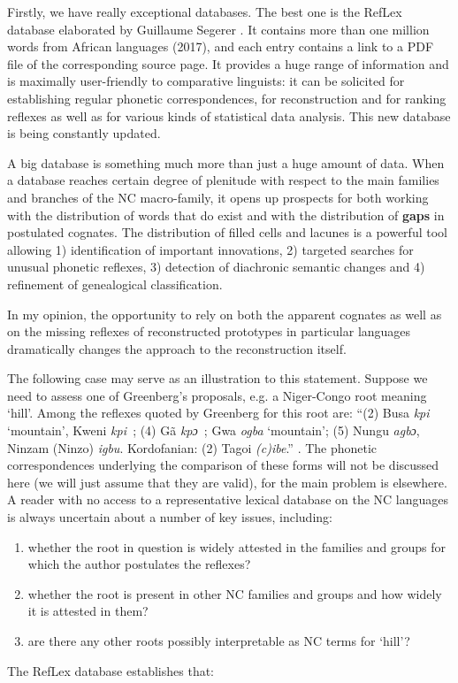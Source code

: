 Firstly, we have really exceptional databases. The best one is the RefLex database elaborated by Guillaume Segerer \citep{RefLex}. It contains more than one million words from African languages (2017), and each entry contains a link to a PDF file of the corresponding source page. It provides a huge range of information and is maximally user-friendly to comparative linguists: it can be solicited for establishing regular phonetic correspondences, for reconstruction and for ranking reflexes as well as for various kinds of statistical data analysis. This new database is being constantly updated. 

A big database is something much more than just a huge amount of data. When a database  reaches certain degree of plenitude with respect to the main families and branches of the NC macro-family, it opens up prospects for both working with the distribution of words that do exist and with the distribution of \textbf{gaps} in postulated cognates. The distribution of filled cells and lacunes is a powerful tool allowing 1) identification of important innovations, 2) targeted searches for unusual phonetic reflexes, 3) detection of diachronic semantic changes and 4) refinement of genealogical classification.

In my opinion, the opportunity to rely on both the apparent cognates as well as on the missing reflexes of reconstructed prototypes in particular languages dramatically changes the approach to the reconstruction itself.

The following case may serve as an illustration to this statement. Suppose we need to assess one of Greenberg’s proposals, e.g. a Niger-Congo root meaning ‘hill’. Among the reflexes quoted by Greenberg for this root are: “(2) Busa \textit{kpi} ‘mountain’, Kweni  \textit{kpi~}; (4) Gã \textit{kpɔ~}; Gwa \textit{ogba} ‘mountain’; (5) Nungu \textit{agbɔ}, Ninzam (Ninzo) \textit{igbu}. Kordofanian: (2) Tagoi \textit{(c)ibe}.” \citep[155]{Greenberg1966}. The phonetic correspondences underlying the comparison of these forms will not be discussed here (we will just assume that they are valid), for the main problem is elsewhere. A reader with no access to a representative lexical database on the NC languages is always uncertain about a number of key issues, including:

\begin{enumerate}
\item whether the root in question is widely attested in the families and groups for which the author postulates the reflexes?
\item whether the root is present in other NC families and groups and how widely it is attested in them?
\item are there any other roots possibly interpretable as NC terms for ‘hill’?
\end{enumerate}
The RefLex database establishes  that: 

